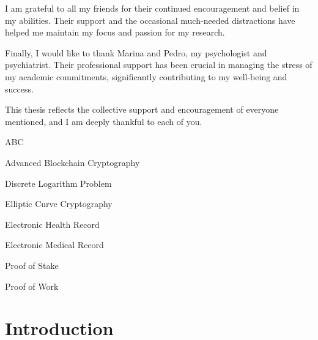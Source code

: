 \documentclass[cic,tc,english]{iiufrgs}
\begin{document}
    I am grateful to all my friends for their continued encouragement and belief
    in my abilities. Their support and the occasional much-needed distractions 
    have helped me maintain my focus and passion for my research.

    Finally, I would like to thank Marina and Pedro, my psychologist and 
    psychiatrist. Their professional support has been crucial in managing the 
    stress of my academic commitments, significantly contributing to my 
    well-being and success.

    This thesis reflects the collective support and encouragement of everyone 
    mentioned, and I am deeply thankful to each of you.

\begin{abstract}
    \lipsum[1]
\end{abstract}

\begin{translatedabstract}
    \lipsum[1]
\end{translatedabstract}

\listoffigures

\listoftables

\begin{listofabbrv}{ABC} %
    \item[ABC] Advanced Blockchain Cryptography
    \item[DLP] Discrete Logarithm Problem
    \item[ECC] Elliptic Curve Cryptography
    \item[EHR] Electronic Health Record
    \item[EMR] Electronic Medical Record
    \item[PoS] Proof of Stake
    \item[PoW] Proof of Work
\end{listofabbrv}


\tableofcontents

\chapter{Introduction}
\end{document}
